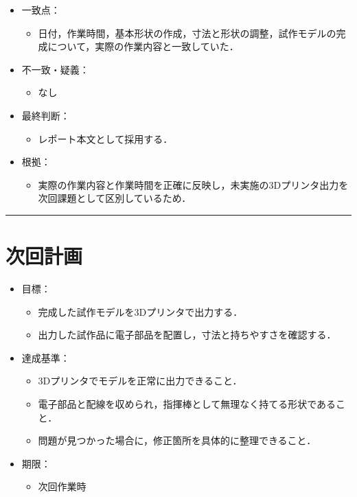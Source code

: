 \documentclass[uplatex,dvipdfmx,a4paper,11pt]{jsarticle}
\newcommand{\sectionrule}{\par\medskip\noindent\rule{\linewidth}{0.6pt}\par\medskip}
\begin{document}
\begin{itemize}
  \item 一致点：
    \begin{itemize}
      \item 日付，作業時間，基本形状の作成，寸法と形状の調整，試作モデルの完成について，実際の作業内容と一致していた．
    \end{itemize}
  \item 不一致・疑義：
    \begin{itemize}
      \item なし
    \end{itemize}
  \item 最終判断：
    \begin{itemize}
      \item レポート本文として採用する．
    \end{itemize}
  \item 根拠：
    \begin{itemize}
      \item 実際の作業内容と作業時間を正確に反映し，未実施の3Dプリンタ出力を次回課題として区別しているため．
    \end{itemize}
\end{itemize}

\sectionrule

\enlargethispage{2\baselineskip}
\section{次回計画}

\begin{itemize}
  \item 目標：
    \begin{itemize}
      \item 完成した試作モデルを3Dプリンタで出力する．
      \item 出力した試作品に電子部品を配置し，寸法と持ちやすさを確認する．
    \end{itemize}
  \item 達成基準：
    \begin{itemize}
      \item 3Dプリンタでモデルを正常に出力できること．
      \item 電子部品と配線を収められ，指揮棒として無理なく持てる形状であること．
      \item 問題が見つかった場合に，修正箇所を具体的に整理できること．
    \end{itemize}
  \item 期限：
    \begin{itemize}
      \item 次回作業時
    \end{itemize}
\end{itemize}
\end{document}
